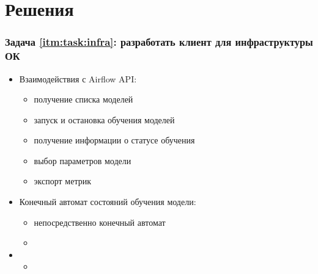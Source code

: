 \section{Решения}

\begin{frame}
\frametitle{Задача \ref{itm:task:infra}: разработать клиент для инфраструктуры ОК}
\begin{itemize}
	\item Взаимодействия с Airflow API:
	\begin{itemize}
		\item получение списка моделей
		\item запуск и остановка обучения моделей
		\item получение информации о статусе обучения
		\item выбор параметров модели
		\item экспорт метрик
	\end{itemize}
	\item Конечный автомат состояний обучения модели:
	\begin{itemize}
		\item непосредственно конечный автомат
		\item {}
	\end{itemize}
	\item {}
	\begin{itemize}
		\item {}
	\end{itemize}
\end{itemize}
\end{frame}

